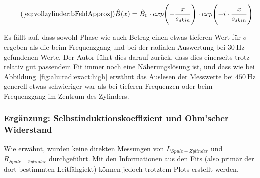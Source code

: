 {\begin{minipage}[t]{0.33\textwidth}
        \begin{equation}
            \tag{\ref{eq:vollzylinder:bFeldApprox}}
            \hat{B} (x) = \hat{B}_0 \cdot exp\Biggl(-\frac{x}{s_{skin}} \Biggr) \cdot exp\Biggl(-i \cdot \frac{x}{s_{skin}} \Biggr)
        \end{equation}

        

        \vspace{1em}

        Es f\"allt auf, dass sowohl Phase wie auch Betrag einen etwas tieferen
        Wert  f\"ur $\sigma$  ergeben als  die beim  Frequenzgang und  bei der
        radialen Auswertung bei  $\SI{30}{\hertz}$ gefundenen Werte. Der Autor
        f\"uhrt dies darauf zur\"uck, dass  dies einerseits trotz relativ  gut
        passendem  Fit  immer  noch  eine N\"aherungsl\"osung  ist,  und  dass
        wie bei Abbildung~\ref{fig:alu:rad:exact:high}  erw\"ahnt das Auslesen
        der Messwerte  bei $\SI{450}{\hertz}$  generell etwas  schwieriger war
        als  bei tieferen  Frequenzen oder  beim Frequenzgang  im Zentrum  des
        Zylinders.
	\end{minipage}%
	\begin{minipage}[t]{0.67\textwidth}
        \vspace{0mm}
        \resizebox{.95\textwidth}{!}{}
        \label{fig:alu:rad:approx:high}
	\end{minipage}

    \subsubsection{Erg\"anzung: Selbstinduktionskoeffizient und Ohm'scher Widerstand}
    \label{sec:ausw:subsec:vollz:subsubsec:LR}

	\begin{minipage}[t]{0.33\textwidth}
        \vspace{0mm}
        Wie  erw\"ahnt,  wurden  keine  direkten  Messungen  von  $L_{Spule  +
        Zylinder}$   und  $R_{Spule   +  Zylinder}$   durchgef\"uhrt. Mit  den
        Informationen  aus  den  Fits   (also  prim\"ar  der  dort  bestimmten
        Leitf\"ahgiekt) k\"onnen jedoch trotztem Plots erstellt werden.


\end{minipage}}
